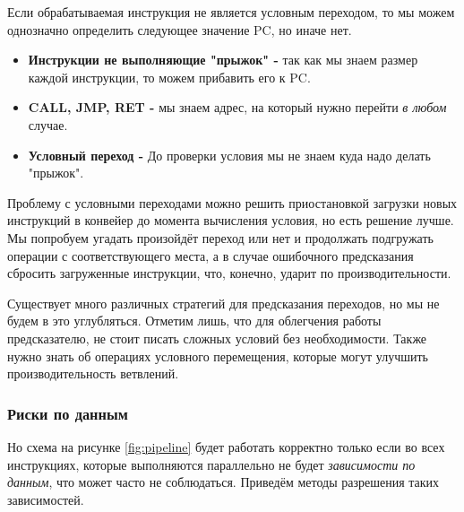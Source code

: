 \documentclass[12pt,a4paper]{article}
\begin{document}
Если обрабатываемая инструкция не является условным переходом, то мы можем однозначно определить следующее значение PC, но иначе нет.

\begin{itemize}
    \item \textbf{Инструкции не выполняющие "прыжок" - } так как мы знаем размер каждой инструкции, то можем прибавить его к PC.
    \item \textbf{CALL, JMP, RET - } мы знаем адрес, на который нужно перейти \textit{в любом} случае.
    \item \textbf{Условный переход - } До проверки условия мы не знаем куда надо делать "прыжок".
\end{itemize}

Проблему с условными переходами можно решить приостановкой загрузки новых инструкций в конвейер до момента вычисления условия, но есть решение лучше. Мы попробуем угадать произойдёт переход или нет и продолжать подгружать операции с соответствующего места, а в случае ошибочного предсказания сбросить загруженные инструкции, что, конечно, ударит по производительности.

Существует много различных стратегий для предсказания переходов, но мы не будем в это углубляться. Отметим лишь, что для облегчения работы предсказателю, не стоит писать сложных условий без необходимости. Также нужно знать об операциях условного перемещения, которые могут улучшить производительность ветвлений.

\subsubsection{Риски по данным}

Но схема на рисунке \ref{fig:pipeline} будет работать корректно только если во всех инструкциях, которые выполняются параллельно не будет \textit{зависимости по данным}, что может часто не соблюдаться. Приведём методы разрешения таких зависимостей.
\end{document}
